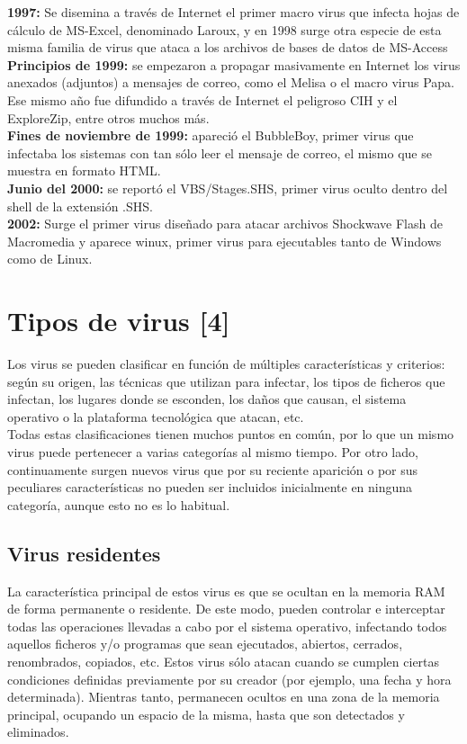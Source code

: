 \documentclass[12pt,a4paper]{article}
\begin{document}
	\textbf{1997:} Se disemina a través de Internet el primer macro virus que infecta hojas de cálculo de MS-Excel, denominado Laroux, y en 1998 surge otra especie de esta misma familia de virus que ataca a los archivos de bases de datos de MS-Access\\
	
	\textbf{Principios de 1999:} se empezaron a propagar masivamente en Internet los virus anexados (adjuntos) a mensajes de correo, como el Melisa o el macro virus Papa. Ese mismo año fue difundido a través de Internet el peligroso CIH y el ExploreZip, entre otros muchos más.\\
	
	\textbf{Fines de noviembre de 1999:} apareció el BubbleBoy, primer virus que infectaba los sistemas con tan sólo leer el mensaje de correo, el mismo que se muestra en formato HTML.\\
	
	\textbf{Junio del 2000:} se reportó el VBS/Stages.SHS, primer virus oculto dentro del shell de la extensión .SHS.\\
	
	\textbf{2002:} Surge el primer virus diseñado para atacar archivos Shockwave Flash de Macromedia y aparece winux, primer virus para ejecutables tanto de Windows como de Linux.
	
	\section{Tipos de virus [4]}
	
	Los virus se pueden clasificar en función de múltiples características y criterios: según su origen, las técnicas que utilizan para infectar, los tipos de ficheros que infectan, los lugares donde se esconden, los daños que causan, el sistema operativo o la plataforma tecnológica que atacan, etc.\\
	
	Todas estas clasificaciones tienen muchos puntos en común, por lo que un mismo virus puede pertenecer a varias categorías al mismo tiempo.
	Por otro lado, continuamente surgen nuevos virus que por su reciente aparición o por sus peculiares características no pueden ser incluidos inicialmente en ninguna categoría, aunque esto no es lo habitual.
	
	\subsection{Virus residentes}
	La característica principal de estos virus es que se ocultan en la memoria RAM de forma permanente o residente. De este modo, pueden controlar e interceptar todas las operaciones llevadas a cabo por el sistema operativo, infectando todos aquellos ficheros y/o programas que sean ejecutados, abiertos, cerrados, renombrados, copiados, etc.
	Estos virus sólo atacan cuando se cumplen ciertas condiciones definidas previamente por su creador (por ejemplo, una fecha y hora determinada). Mientras tanto, permanecen ocultos en una zona de la memoria principal, ocupando un espacio de la misma, hasta que son detectados y eliminados.
	
\end{document}
